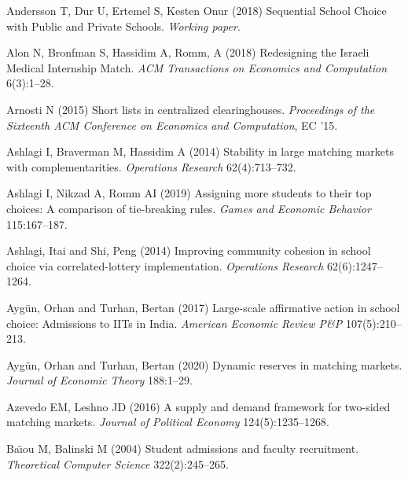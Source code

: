 \begin{thebibliography}{36}
  Andersson T, Dur U, Ertemel S, Kesten Onur (2018) Sequential School Choice with Public and Private Schools. \emph{Working paper}.

    Alon N, Bronfman S, Hassidim A, Romm, A (2018) Redesigning the Israeli Medical
    Internship Match. \emph{ACM Transactions on Economics and Computation} 6(3):1--28.

Arnosti N (2015) Short lists in centralized clearinghouses. \emph{Proceedings
  of the Sixteenth ACM Conference on Economics and Computation}, EC '15.

Ashlagi I, Braverman M, Hassidim A (2014) Stability in large matching markets
  with complementarities. \emph{Operations Research} 62(4):713--732.

Ashlagi I, Nikzad A, Romm AI (2019) Assigning more students to their top
  choices: A comparison of tie-breaking rules. \emph{Games and Economic Behavior} 115:167--187.

Ashlagi, Itai and Shi, Peng (2014{}) Improving community cohesion in school choice via correlated-lottery implementation. \emph{Operations Research} 62(6):1247--1264.

Ayg{\"{u}}n, Orhan and Turhan, Bertan (2017) Large-scale affirmative action in school choice: Admissions to IITs in India. \emph{American Economic Review P\&P} 107(5):210--213.

Ayg{\"{u}}n, Orhan and Turhan, Bertan (2020) Dynamic reserves in matching markets. \emph{Journal of Economic Theory} 188:1--29.

  Azevedo EM, Leshno JD (2016) A supply and demand framework for two-sided matching markets. \emph{Journal of Political Economy} 124(5):1235--1268.

Ba{\"\i}ou M, Balinski M (2004) Student admissions and faculty recruitment.
  \emph{Theoretical Computer Science} 322(2):245--265.


\end{thebibliography}

